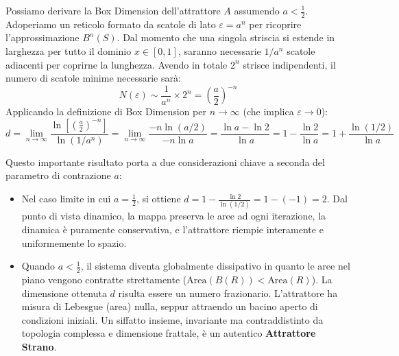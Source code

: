\documentclass[openany]{book}
\theoremstyle{definition}
\theoremstyle{remark}
\begin{document}
Possiamo derivare la Box Dimension dell'attrattore $A$ assumendo $a < \frac{1}{2}$. Adoperiamo un reticolo formato da scatole di lato $\varepsilon = a^n$ per ricoprire l'approssimazione $B^n(S)$. Dal momento che una singola striscia si estende in larghezza per tutto il dominio $x \in [0,1]$, saranno necessarie $1/a^n$ scatole adiacenti per coprirne la lunghezza. Avendo in totale $2^n$ strisce indipendenti, il numero di scatole minime necessarie sarà:
\begin{equation}
    N(\varepsilon) \sim \frac{1}{a^n} \times 2^n = \left(\frac{a}{2}\right)^{-n}
\end{equation}
Applicando la definizione di Box Dimension per $n \to \infty$ (che implica $\varepsilon \to 0$):
\begin{equation}
    d = \lim_{n \to \infty} \frac{\ln\left[ \left(\frac{a}{2}\right)^{-n} \right]}{\ln(1/a^n)} = \lim_{n \to \infty} \frac{-n \ln(a/2)}{-n \ln a} = \frac{\ln a - \ln 2}{\ln a} = 1 - \frac{\ln 2}{\ln a} = 1 + \frac{\ln(1/2)}{\ln a}
\end{equation}

Questo importante risultato porta a due considerazioni chiave a seconda del parametro di contrazione $a$:
\begin{itemize}
    \item Nel caso limite in cui $a = \frac{1}{2}$, si ottiene $d = 1 - \frac{\ln 2}{\ln(1/2)} = 1 - (-1) = 2$. Dal punto di vista dinamico, la mappa preserva le aree ad ogni iterazione, la dinamica è puramente conservativa, e l'attrattore riempie interamente e uniformemente lo spazio.
    \item Quando $a < \frac{1}{2}$, il sistema diventa globalmente dissipativo in quanto le aree nel piano vengono contratte strettamente ($\text{Area}(B(R)) < \text{Area}(R)$). La dimensione ottenuta $d$ risulta essere un numero frazionario. L'attrattore ha misura di Lebesgue (area) nulla, seppur attraendo un bacino aperto di condizioni iniziali. Un siffatto insieme, invariante ma contraddistinto da topologia complessa e dimensione frattale, è un autentico \textbf{Attrattore Strano}.
\end{itemize}
\end{document}
